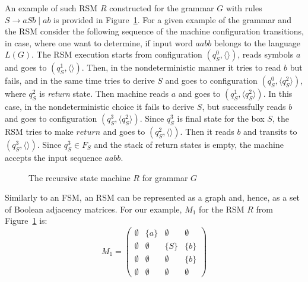 An example of such RSM $R$ constructed for the grammar $G$ with rules $S \to a S b \mid a b$ is provided in Figure~\ref{example:automata}. 
For a given example of the grammar and the RSM consider the following sequence of the machine configuration transitions, in case, where one want to determine, if input word $aabb$ belongs to the language $L(G)$. 
The RSM execution starts from configuration $(q_S^0,\langle \rangle)$, reads symbols $a$ and goes to $(q_S^1, \langle \rangle)$. 
Then, in the nondeterministic manner it tries to read $b$ but fails, and in the same time tries to derive $S$ and goes to configuration $(q_S^0, \langle q_S^2 \rangle)$, where $q_S^2$ is \textit{return} state. 
Then machine reads $a$ and goes to $(q_S^1, \langle q_S^2 \rangle)$. In this case, in the nondeterministic choice it fails to derive $S$, but successfully reads $b$ and goes to configuration $(q_S^3,\langle q_S^2 \rangle)$. 
Since $q_S^3$ is final state for the box $S$, the RSM tries to make $return$ and goes to $(q_S^2,\langle \rangle)$. 
Then it reads $b$ and transits to $(q_S^3,\langle \rangle)$. 
Since $q_S^3 \in F_S$ and the stack of return states is empty, the machine accepts the input sequence $aabb$.
\begin{figure}[h]
    \centering
    \caption{The recursive state machine $R$ for grammar $G$}
    \label{example:automata}
\end{figure}


Similarly to an FSM, an RSM can be represented as a graph and, hence, as a set of Boolean adjacency matrices.
For our example, $M_1$ for the RSM $R$ from Figure~\ref{example:automata} is:
    $$
    M_1 =
    \begin{pmatrix}
    \emptyset & \{a\} &   \emptyset &  \emptyset     \\
     \emptyset &  \emptyset & \{S\} & \{b\} \\
     \emptyset &  \emptyset &  \emptyset & \{b\}     \\
     \emptyset &  \emptyset &   \emptyset&   \emptyset
    \end{pmatrix}
    $$

